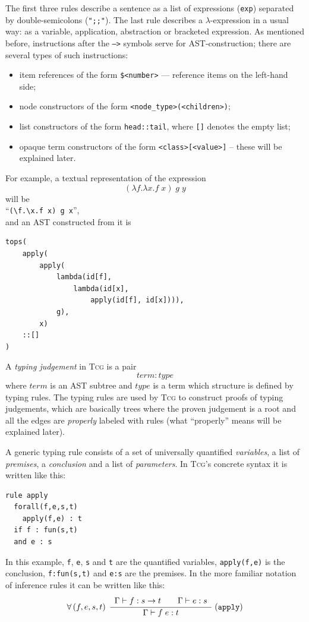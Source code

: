 \documentclass[a4paper,12pt]{article}
\newcommand{\Tcg}{\textsc{Tcg}}
\newcommand{\code}[1]{\texttt{#1}}
\newcounter{premise}
\newcommand{\ifnotempty}[2]{\ifthenelse{\equal{#1}{}}{}{#2}}
\newcommand{\tcgrule}[5]{%
	\setcounter{premise}{0}%
$$%
    \ifnotempty{#1}{%
        \forall \left(#1\right)\;%
    }%
    \dfrac{%
	    \begin{array}[b]{l}%
	    #2%
            \end{array}%
    }{%
            #3%
    }%
    \;\ifnotempty{#4}{(\mathtt{#4}\ifnotempty{#5}{[\mathbf{#5}]})}%
$$%
}
\begin{document}
The first three rules describe a sentence as a list of expressions (\code{exp}) separated by double-semicolons (\code{";;"}). The last rule describes a $\lambda$-expression in a usual way: as a variable, application, abstraction or bracketed expression. As mentioned before, instructions after the \code{-->} symbols serve for AST-construction; there are several types of such instructions:
\begin{itemize}
 \item item references of the form \code{\$<number>} --- reference items on the left-hand side;
 \item node constructors of the form \code{<node_type>(<children>)};
 \item list constructors of the form \code{head::tail}, where \code{[]} denotes the empty list;
 \item opaque term constructors of the form \code{<class>[<value>]} -- these will be explained later.
\end{itemize}

For example, a textual representation of the expression 
$$(\lambda f.\lambda x. f\; x)\; g\; y$$
will be \\
``\code{(\textbackslash f.\textbackslash x.f x) g x}'', \\
and an AST constructed from it is%
\begin{verbatim}
tops(
    apply(
        apply(
            lambda(id[f], 
                lambda(id[x], 
                    apply(id[f], id[x]))),
            g),
        x)
    ::[]
)
\end{verbatim}

A \emph{typing judgement} in \Tcg{} is a pair 
$$term : type$$
where $term$ is an AST subtree and $type$ is a term which structure is defined by typing rules. The typing rules are used by \Tcg{} to construct proofs of typing judgements, which are basically trees where the proven judgement is a root and all the edges are \emph{properly} labeled with rules (what ``properly'' means will be explained later). 

A generic typing rule consists of a set of universally quantified \emph{variables}, a list of \emph{premises}, a \emph{conclusion} and a list of \emph{parameters}. In \Tcg{}'s concrete syntax it is written like this:
\begin{verbatim}
rule apply
  forall(f,e,s,t)
    apply(f,e) : t
  if f : fun(s,t)
  and e : s
\end{verbatim}

In this example, \code{f}, \code{e}, \code{s} and \code{t} are the quantified variables, \code{apply(f,e)} is the conclusion, \code{f:fun(s,t)} and \code{e:s} are the premises. In the more familiar notation of inference rules it can be written like this:
\tcgrule{f, e, s, t}{
    \Gamma \vdash f : s \rightarrow t
    \hspace{20pt}
    \Gamma \vdash e : s
}{\Gamma \vdash f\; e : t}{apply}{}
\end{document}
